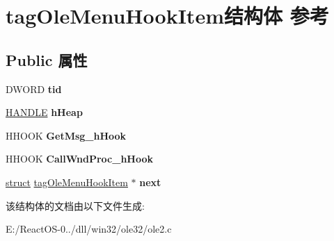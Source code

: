 \hypertarget{structtag_ole_menu_hook_item}{}\section{tag\+Ole\+Menu\+Hook\+Item结构体 参考}
\label{structtag_ole_menu_hook_item}
\subsection*{Public 属性}
\begin{DoxyCompactItemize}
\item 
\mbox{\label{structtag_ole_menu_hook_item_a044afbc39a972ad47e12f8076fdf42d5}} 
D\+W\+O\+RD {\bfseries tid}
\item 
\mbox{\label{structtag_ole_menu_hook_item_a4bf6151989fc015dc6041cc4a331fc47}} 
\hyperlink{interfacevoid}{H\+A\+N\+D\+LE} {\bfseries h\+Heap}
\item 
\mbox{\label{structtag_ole_menu_hook_item_aa25022876d4693cda08ebf7bf6506031}} 
H\+H\+O\+OK {\bfseries Get\+Msg\+\_\+h\+Hook}
\item 
\mbox{\label{structtag_ole_menu_hook_item_ac986112904da6460921be49087a54f8a}} 
H\+H\+O\+OK {\bfseries Call\+Wnd\+Proc\+\_\+h\+Hook}
\item 
\mbox{\label{structtag_ole_menu_hook_item_adc183a5c0bb2679ac292a54892f3a286}} 
\hyperlink{interfacestruct}{struct} \hyperlink{structtag_ole_menu_hook_item}{tag\+Ole\+Menu\+Hook\+Item} $\ast$ {\bfseries next}
\end{DoxyCompactItemize}


该结构体的文档由以下文件生成\+:\begin{DoxyCompactItemize}
\item 
E\+:/\+React\+O\+S-\/0../dll/win32/ole32/ole2.\+c\end{DoxyCompactItemize}
